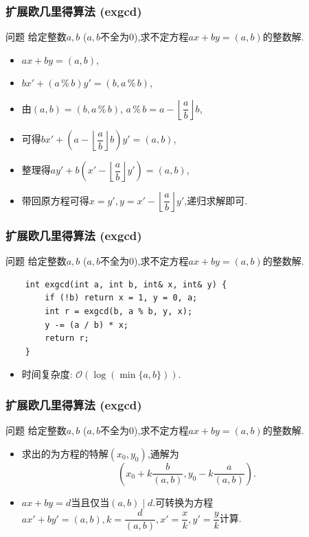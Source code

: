 \documentclass{beamer}
\newcommand{\pau}{}
\begin{document}
\begin{frame}[fragile]
    \frametitle{扩展欧几里得算法 (exgcd)}
    \begin{block}{问题}
        给定整数$a,b$ ($a,b$不全为$0$),求不定方程$ax+by=(a,b)$的整数解.
    \end{block}\pau
    \begin{itemize}
        \item $ax+by=(a,b)$, \pau
        \item $bx'+(a\,\%\,b)y'=(b,a\,\%\,b)$, \pau
        \item 由$(a,b)=(b,a\,\%\,b)$, $a\,\%\,b=a-\left\lfloor\dfrac{a}{b}\right\rfloor b$, \pau
        \item 可得$bx'+\left(a-\left\lfloor\dfrac{a}{b}\right\rfloor b\right)y'=(a,b)$, \pau
        \item 整理得$ay'+b\left(x'-\left\lfloor\dfrac{a}{b}\right\rfloor y'\right)=(a,b)$, \pau
        \item 带回原方程可得$x=y',y=x'-\left\lfloor\dfrac{a}{b}\right\rfloor y'$,递归求解即可.
    \end{itemize}
\end{frame}

\begin{frame}[fragile]
    \frametitle{扩展欧几里得算法 (exgcd)}
    \begin{block}{问题}
        给定整数$a,b$ ($a,b$不全为$0$),求不定方程$ax+by=(a,b)$的整数解.
    \end{block}
    \begin{verbatim}
    int exgcd(int a, int b, int& x, int& y) {
        if (!b) return x = 1, y = 0, a;
        int r = exgcd(b, a % b, y, x);
        y -= (a / b) * x;
        return r;
    }
    \end{verbatim}
    \pau\begin{itemize}
        \item 时间复杂度: $\mathcal{O}(\log(\min\{a,b\}))$.
    \end{itemize}
\end{frame}

\begin{frame}[fragile]
    \frametitle{扩展欧几里得算法 (exgcd)}
    \begin{block}{问题}
        给定整数$a,b$ ($a,b$不全为$0$),求不定方程$ax+by=(a,b)$的整数解.
    \end{block}
    \begin{itemize}
        \item 求出的为方程的特解$(x_0,y_0)$,通解为$$\left(x_0+k\dfrac{b}{(a,b)},y_0-k\dfrac{a}{(a,b)}\right).$$ \pau
        \item $ax+by=d$当且仅当$(a,b)\mid d$.可转换为方程$ax'+by'=(a,b),k=\dfrac{d}{(a,b)},x'=\dfrac{x}{k},y'=\dfrac{y}{k}$计算.
    \end{itemize}
\end{frame}
\end{document}
